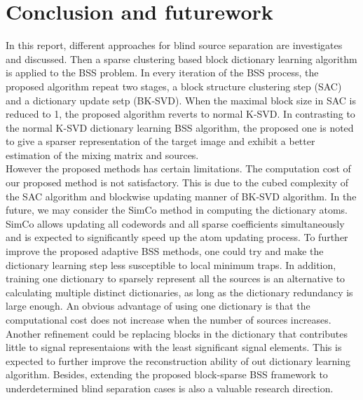 \section{Conclusion and futurework}
In this report, different approaches for blind source separation are investigates and discussed. Then a sparse clustering based block dictionary learning algorithm is applied to the BSS problem. In every iteration of the BSS process, the proposed algorithm repeat two stages, a block structure clustering step (SAC) and a dictionary update setp (BK-SVD). When the maximal block size in SAC is reduced to 1, the proposed algorithm reverts to normal K-SVD. In contrasting to the normal K-SVD dictionary learning BSS algorithm, the proposed one is noted to give a sparser representation of the target image and exhibit a better estimation of the mixing matrix and sources.\\

However the proposed methods has certain limitations. The computation cost of our proposed method is not satisfactory. This is due to the cubed complexity of the SAC algorithm and blockwise updating manner of BK-SVD algorithm. In the future, we may consider the SimCo method \cite{6340354} in computing the dictionary atoms. SimCo allows updating all codewords and all sparse coefficients simultaneously and is expected to significantly speed up the atom updating process. To further improve the proposed adaptive BSS methods, one could try and make the dictionary learning step less susceptible to local minimum traps. In addition, training one dictionary to sparsely represent all the sources is an alternative to calculating multiple distinct dictionaries, as long as the dictionary redundancy is large enough. An obvious advantage of using one dictionary is that the computational cost does not increase when the number of sources increases. Another refinement could be replacing blocks in the dictionary that contributes little to signal representaions with the least significant signal elements. This is expected to further improve the reconstruction ability of out dictionary learning algorithm. Besides, extending the proposed block-sparse BSS framework to underdetermined blind separation cases is also a valuable research direction.

